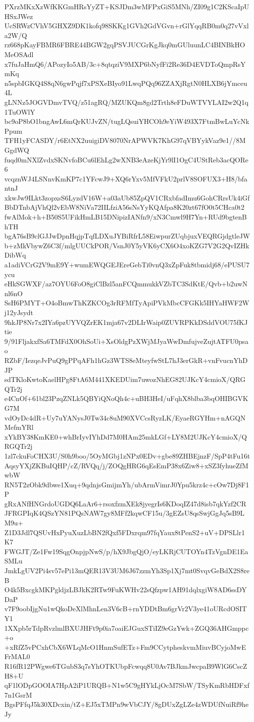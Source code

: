 PXrzMKxXzWfKKGmHRsYyZT+KSJDm3wMFPxGiS5MNh/ZI09g1C2KScaIpUHSxJWez
UcSRWzCVhV5GHXZ9DK1kofq98SKKg1GVh2GdVGvn+rGlYqqRB0m0q27vVxla2W/Q
rz668pKayFBMR6FBRE44BGW2gqPSVJUCGrKgJkq0mGUluunLC4BINBkHOMeOSAdl
x7fuJaHmQ6/APozyIo5AB/3c+8qtqziV9MXP6bNyfFi2Re36D4EVDToQmpRsYmKq
n5spbIGKQ4S8qN6gwPqjf7xPSXeBIyo91LwqPQq96ZZAXjRgtN0HLXB6jYmceu4L
gLNNz5JOGVDmvTVQ/z51agRQ/MZUKQm8gd2Trth8eFDuWTVYLAI2w2Q1q1TuOWlY
bc9oP8bO1bngAwL6mQrKUJvZN/tugLQsuiYHCOh9eYiW493X7FtmBwLuYcNkPpum
TFH1yFCASDY/r6EtNX2uuigiDV8070NrAPWVK7KhG97qVBYykVaz9e1//8MGgdWQ
fuqd0mNXlZvdxSKNvfoBCu6lEhLg2wXNB3eAzeKjYr9lI1OgC4UStReb3acQORe6
vcqznWJ4LSNnvKmKP7c1YFcwJ9+XQ6rYxv5MfVFkU2prlV8SOFUX3+H8/bfantnJ
xkwJw9ILkt3zopxsS6LyzdV16W+a03aUb85ZpQV1CRxbfadImu6GohCRrsUk4iGf
BbDTnbAjVhQl2vEbW8NiVa72IILfziA56sNsYyKQAfpa8K20zt67fO0t5CHca0t2
fwAlMok+h+B50S5UFikHmLB15DNipizIANfn9/xN3Cmwl9H7Yn+RUd9bgtenBhTH
bgA76sB9clGJJwDpnHqjpTqfLDXuJYBiRfrL58EiwpurZUqbjuxVEQRGjdgtleJW
b+zMkVbywZ6C3f/mlgUUCkPOR/VsnJ0Y5yVK6yCX6O4xoKZG7V2G2QvIZHkDibWq
a1adiVCrG2V9mE9Y+wumEWQGEJEreGebTi0vnQ3xZpFuk8tbmidj68/ePUSU7ycu
eHkSGWXF/az7OYU6FoO8giClBzl5anFCQmmukkVZbTC3SdKtE/Qvb+b2uwNnl6nO
SsH6PMYT+O4oBmwThKZKCOg3rRFMfTyApiPVkMbcCFGKk5IHYaHWF2Wj12yJsydt
9hkJP8Nr7x2IYa6pzUYVQZrEK1mja67v2DLIrWaip0ZUVRPKkDSddVOU75fKJtie
9/91FljakxfSa6TMFdX0OhSoUi+XsOldgPzXWjMJyaWwDmfujveZujtATFU0psao
RZbF/IezqeJvPuQ9gPPqAFh1hGz3WTS8eMteyfwStL7hJ3erGkR+vnFvucnYhDJP
sdTKloKwtoKaelHPg8FtA6M441XKEDUim7uwozNhEG82UJKcY4cmioX/QRGQTr2j
e4CnOf+61bl23PzqZNLk5QBYiQNoQh4c+uBH3HeI/uFqhX8blba3bqOHIBGVKG7M
vdOyDc4dR+Uy7uYANysJ0Tw34c8uM90XVCcsRyzLK/EyaeRGYHm+nAGQNMefmYRl
xYkBY38KmKE0+whBrIyvIYhDd7M0HAm25mkLGf+LY8M2UJKcY4cmioX/QRGQTr2j
1zl7ckuFoCHX3U/S0h9boo/5OyMGbj1zNPx0EDv+gbe89ZHBEjnzF/SpP4tFu16t
AqsyYXjZKBuIQHP/cZ/RVQq/j/ZOQgHRG6qEsEmP38x6Ziw8+xSZ3fyhueZfMwbW
RN5T2zObk9dbwe1Xuq+9qdnjsGmijmYh/ubArmVimrJ0Ypu5krz4c+cOw7Dj8F1P
gRxANfHNGrdoUGDQ6LaAr6+rsoxfzmXEk8jyegrIs6KDoqIZ47d8isb7qkYzf2CR
JFRGPIqK4QSzYN81PQsNAW7gy8MFf2kqwCF15u/3gEZsU8qsSwjGgJq5sB9LM9u+
Z1D3Jdl7QSUvHxPyuXuzLbBN2fQxf5FDxrqm97fqYaux8tPenS2+uV+DPSLlr1K7
FWGJT/Ze1Fw19SqgOnpjpNwS/p/hX9JbgQjO/eyLKRjCUTOYn4TzVgnDE1EaSMLu
JmkLgUV2Pi4sv57ePi13mQER13V3UM6J67zzmYh3Sp1Xj7mt0SvqvGeBdX2S8reB
O4k5BxcgkMKPgldjzLBJkK2RTw9FuKWHv22sQfzpw1AH91dqlxgiW8AD6ssDYDaP
v7F9oobIjgNu1wQkoDeXlMhnLen3V6cB+rnYDDtBm6grVr2V3ye41oURcdOSITY1
1XXpb5rTdpRvzlmlBXUJHFt9p0ia7oaiEJGuxSTiIZ9eGzYwk+ZGQ36AHGmppc+o
+xRfZ5vPCxhCbX6WLqMcO1HnmSufETz+Fm9CCytpheskvmMiuvBCyjoMwEFrMAL0
R16fR12PWgwe6TGubS3q7sYhOTKUbpFcwqq8U0Av7BJkmJwcpaB9WlG6CscZH8+U
qF1lODpGOOIA7HpA2iP1URQB+N1w5C9gHYkLjOcM7SbW/TSyKmRbHDFxf7n1GsrM
BgsPFfqJ5k30XDcxin/tZ+EJ5xTMPn9wVbCJY/8gDUxZgLZe4zWDUfNuiRf9heJy
